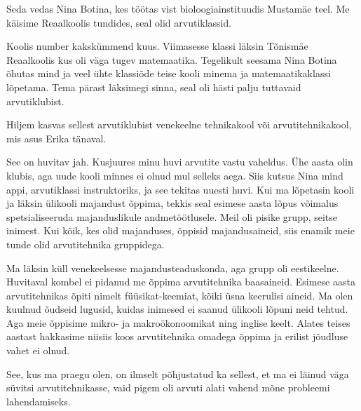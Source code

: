
Seda vedas Nina Botina, kes töötas vist bioloogiainstituudis Mustamäe teel. Me käisime 
Reaalkoolis tundides,
seal olid arvutiklassid.


Koolis number kakskümmend kuus. 
Viimasesse klassi läksin Tõnismäe Reaalkoolis 
kus oli väga tugev matemaatika. Tegelikult seesama Nina Botina õhutas mind ja 
veel ühte klassiõde teise kooli minema ja 
matemaatikaklassi lõpetama. Tema pärast läksimegi sinna, seal oli hästi palju  
tuttavaid arvutiklubist.

Hiljem kasvas sellest arvutiklubist venekeelne tehnikakool või
arvutitehnikakool, mis asus Erika tänaval. 


See on huvitav jah. Kusjuures minu huvi arvutite vastu 
vaheldus. Ühe aasta olin klubis, aga uude kooli minnes ei olnud mul 
selleks aega. Siis kutsus Nina mind appi, arvutiklassi instruktoriks, ja see 
tekitas uuesti huvi. Kui ma lõpetasin kooli ja läksin
ülikooli majandust õppima, tekkis seal esimese aasta lõpus 
võimalus spetsialiseeruda majanduslikule andmetöötlusele. Meil oli pisike 
grupp, seitse inimest. Kui kõik, kes olid majanduses, õppisid majandusaineid, siis enamik meie tunde olid arvutitehnika gruppidega.

Ma läksin küll venekeelsesse majandusteaduskonda, 
aga grupp oli eestikeelne. Huvitaval kombel ei pidanud me õppima arvutitehnika baasaineid. 
Esimese aasta arvutitehnikas õpiti nimelt füüsikat-keemiat, kõiki üsna 
keerulisi aineid. Ma olen kuulnud õudseid lugusid, kuidas inimesed ei saanud ülikooli 
lõpuni neid tehtud. Aga meie õppisime mikro- ja makroökonoomikat ning 
inglise keelt. Alates teises aastast hakkasime niisiis koos arvutitehnika omadega õppima ja
erilist jõudluse vahet ei olnud.

See, kus ma praegu olen, on ilmselt  
põhjustatud ka sellest, et ma ei läinud väga süvitsi arvutitehnikasse, vaid pigem 
oli arvuti alati vahend mõne probleemi lahendamiseks.


